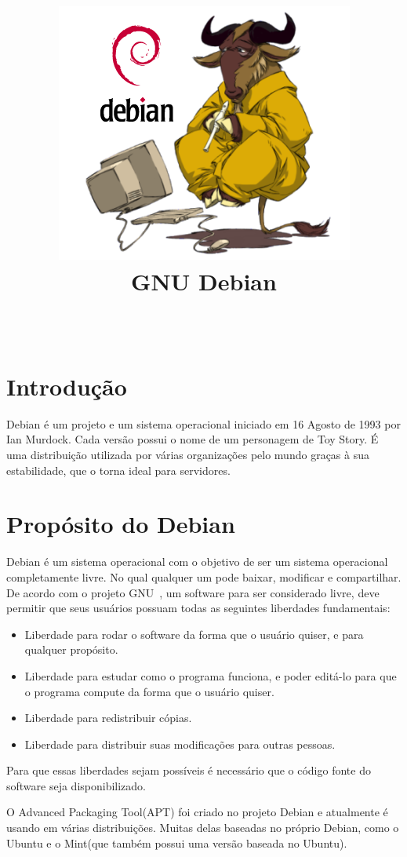 \documentclass[conference]{IEEEtran}
\title{\includegraphics[scale = 0.3]{GnuDebian.png}\\
	GNU Debian}
\author{	
\IEEEauthorblockN{Francisco Anderson Bezerra Rodrigues, Marcelo Bulhões Fonseca, Vitor Silva De Deus} \\
\IEEEauthorblockA{Departamento de Ciência da Computação, \\ Universidade de Brasília\\
}
}
\begin{document}
 

\maketitle
{}  




\section{Introdução}\label{sec:intro}
Debian é um projeto e um sistema operacional iniciado em 16 Agosto de 1993 por Ian Murdock\cite{DebianHistory}. Cada versão possui o nome de um personagem de Toy Story. É uma distribuição utilizada por várias organizações pelo mundo\cite{DebianUsers} graças à sua estabilidade, que o torna ideal para servidores.

\section{Propósito do Debian}\label{sec:prop}
Debian é um sistema operacional com o objetivo de ser um sistema operacional completamente livre. No qual qualquer um pode baixar, modificar e compartilhar. De acordo com o projeto GNU~\cite{FreeSoftware}, um software para ser considerado livre, deve permitir que seus usuários possuam todas as seguintes liberdades fundamentais:
\begin{itemize}
	\item Liberdade para rodar o software da forma que o usuário quiser, e para qualquer propósito.
	\item Liberdade para estudar como o programa funciona, e poder editá-lo para que o programa compute da forma que o usuário quiser.
	\item Liberdade para redistribuir cópias.
	\item Liberdade para distribuir suas modificações para outras pessoas.
\end{itemize}
Para que essas liberdades sejam possíveis é necessário que o código fonte do software seja disponibilizado.

O Advanced Packaging Tool(APT) foi criado no projeto Debian e atualmente é usando em várias distribuições. Muitas delas baseadas no próprio Debian, como o Ubuntu e o Mint(que também possui uma versão baseada no Ubuntu).
\end{document}
